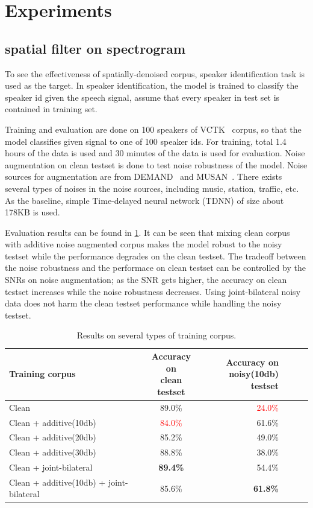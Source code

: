 \documentclass[10pt,twocolumn,letterpaper]{article}
\begin{document}
\section{Experiments}
\label{sec:experiments}

\subsection{spatial filter on spectrogram}
To see the effectiveness of spatially-denoised corpus, speaker identification task is used as the target.
In speaker identification, the model is trained to classify the speaker id given the speech signal,
assume that every speaker in test set is contained in training set.

Training and evaluation are done on 100 speakers of VCTK~\cite{veaux2017cstr} corpus, so that
the model classifies given signal to one of 100 speaker ids.
For training, total 1.4 hours of the data is used and 30 minutes of the data is used for evaluation.
Noise augmentation on clean testset is done to test noise robustness of the model.
Noise sources for augmentation are from DEMAND~\cite{thiemann2013diverse} and MUSAN~\cite{snyder2015musan}.
There exists several types of noises in the noise sources, including music, station, traffic, etc.
As the baseline, simple Time-delayed neural network (TDNN) of size about 178KB is used. 

Evaluation results can be found in \cref{tab:spatial}. It can be seen that mixing clean corpus with 
additive noise augmented corpus makes the model robust to the noisy testset while the performance degrades on the clean testset.
The tradeoff between the noise robustness and the performace on clean testset can be controlled by the 
SNRs on noise augmentation; as the SNR gets higher, the accuracy on clean testset increases while the noise robustness decreases.
Using joint-bilateral noisy data does not harm the clean testset performance while handling the noisy testset.

\begin{table}
   \centering
   \begin{tabular}{@{}lcr@{}lcr@{}}
     \toprule
     Training corpus & \makecell{Accuracy on \\ clean testset} & \makecell{Accuracy on \\ noisy(10db) testset} \\
     \midrule
     Clean & 89.0\% & \textcolor{red}{24.0\%} \\
     Clean + additive(10db) & \textcolor{red}{84.0\%} & 61.6\% \\
     Clean + additive(20db) & 85.2\% & 49.0\% \\
     Clean + additive(30db) & 88.8\% & 38.0\% \\
     Clean + joint-bilateral & \textbf{89.4\%} & 54.4\% \\
     Clean + additive(10db) + joint-bilateral & 85.6\% & \textbf{61.8\%} \\
     \bottomrule
   \end{tabular}
   \caption{Results on several types of training corpus.}
   \label{tab:spatial}
\end{table}
\end{document}
